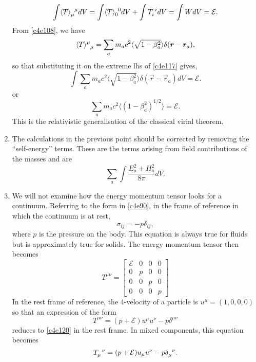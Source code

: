 \begin{enumerate}
\begin{equation}\label{c4e117}
\int \tensor{\langle T \rangle}{_\mu^\mu} dV = \int\tensor{\langle T \rangle}{_0^0} dV + \int\tensor{\bar{T}}{_i^i}dV =
\int WdV = \mathcal{E}.
\end{equation}
From \eqref{c4e108}, we have
\[
\tensor{\langle T \rangle}{^{\mu}_\mu} = \sum_a m_ac^2\langle\sqrt{1 - \beta_a^2}\rangle\delta(\vec{r} - \vec{r}_a),
\]
so that substituting it on the extreme lhs of \eqref{c4e117} gives,
\[
\int \sum_a m_ac^2\langle\sqrt{1 - \beta_a^2}\rangle\delta(\vec{r} - \vec{r}_a) dV = \mathcal{E}.
\]
or
\begin{equation}\label{c4e118}
\sum_a m_ac^2\langle(1 - \beta_a^2)^{1/2}\rangle = \mathcal{E}.
\end{equation}
This is the relativistic generalisation of the classical virial theorem.

\item The calculations in the previous point should be corrected by removing the
``self-energy'' terms. These are the terms arising from field contributions of the
masses and are
\[
\sum_a \int\frac{E_a^2 + H_a^2}{8\pi}dV.
\]

\item We will not examine how the energy momentum tensor looks for a continuum.
Referring to the form in \eqref{c4e90}, in the frame of reference in which the
continuum is at rest,
\begin{equation}\label{c4e119}
\sigma_{ij} = -p\delta_{ij},
\end{equation}
where $p$ is the pressure on the body. This equation is always true for fluids
but is approximately true for solids. The energy momentum tensor then becomes
\begin{equation}\label{c4e120}
T^{\mu\nu} = \begin{bmatrix}\mathcal{E} & 0 & 0 & 0 \\
0 & p & 0 & 0 \\
0 & 0 & p & 0 \\
0 & 0 & 0 & p
\end{bmatrix}
\end{equation}
In the rest frame of reference, the 4-velocity of a particle is $u^\mu = (1, 0, 0, 0)$
so that an expression of the form
\begin{equation}\label{c4e121}
T^{\mu\nu} = (p + \mathcal{E})u^\mu u^\nu - p\delta^{\mu\nu}
\end{equation} 
reduces to \eqref{c4e120} in the rest frame. In mixed components, this equation
becomes
\begin{equation}\label{c4e122}
\tensor{T}{_\mu^\nu} = (p + \mathcal{E})u_\mu u^\nu - p\tensor{\delta}{_\mu^\nu}.
\end{equation} 


\end{enumerate}
